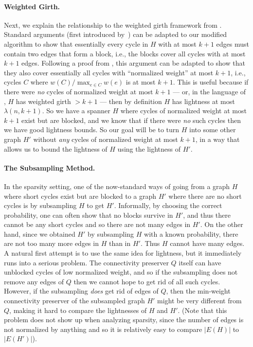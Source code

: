 \documentclass{article}
\theoremstyle{plain}
\theoremstyle{definition}
\begin{document}
\paragraph{Weighted Girth.}
Next, we explain the relationship to the weighted girth framework from \cite{ENS14}.
Standard arguments (first introduced by~\cite{BP19}) can be adapted to our modified algorithm to show that essentially every cycle in $H$ with at most $k+1$ edges must contain two edges that form a block, i.e., the blocks cover all cycles with at most $k+1$ edges.
Following a proof from \cite{ENS14}, this argument can be adapted to show that they also cover essentially all cycles with ``normalized weight'' at most $k+1$, i.e., cycles $C$ where $w(C) / \max_{e \in C} w(e)$ is at most $k+1$.
This is useful because if there were \emph{no} cycles of normalized weight at most $k+1$ --- or, in the language of \cite{ENS14}, $H$ has weighted girth $>k+1$ --- then by definition $H$ has lightness at most $\lambda(n,k+1)$.
So we have a spanner $H$ where cycles of normalized weight at most $k+1$ exist but are blocked, and we know that if there were \emph{no} such cycles then we have good lightness bounds.  So our goal will be to turn $H$ into some other graph $H'$ without \emph{any} cycles of normalized weight at most $k+1$, in a way that allows us to bound the lightness of $H$ using the lightness of $H'$.

\paragraph{The Subsampling Method.}

In the sparsity setting, one of the now-standard ways of going from a graph $H$ where short cycles exist but are blocked to a graph $H'$ where there are no short cycles is by subsampling $H$ to get $H'$. Informally,  by choosing the correct probability, one can often show that no blocks survive in $H'$, and thus there cannot be any short cycles and so there are not many edges in $H'$.  On the other hand, since we obtained $H'$ by subsampling $H$ with a known probability, there are not too many more edges in $H$ than in $H'$.  Thus $H$ cannot have many edges.  
A natural first attempt is to use the same idea for lightness, but it immediately runs into a serious problem.
The connectivity preserver $Q$ itself can have unblocked cycles of low normalized weight, and so if the subsampling does not remove any edges of $Q$ then we cannot hope to get rid of all such cycles.
However, if the subsampling \emph{does} get rid of edges of $Q$, then the min-weight connectivity preserver of the subsampled graph $H'$ might be very different from $Q$, making it hard to compare the lightnesses of $H$ and $H'$.
(Note that this problem does not show up when analyzing sparsity, since the number of edges is not normalized by anything and so it is relatively easy to compare $|E(H)|$ to $|E(H')|$).  
\end{document}
